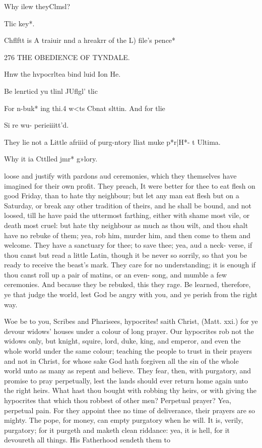 \documentclass{custom}
\begin{document}
{Why ilew 
theyClmsl? 

Tlic key*. 

Chflftt is A 
traiuir nnd 
a hreakrr 
of the 
L) file's 
pence* 


276
THE OBEDIENCE OF
TYNDALE.

Hnw the 
hvpocrltea 
bind luid 
Ion He. 

Be lenrticd 
yu tlinl 
JUflgl' tlic 

For n-buk* 
ing thi.4 
w<ts Cbnat 
slttin. And 
for tlie 

Si re wu- 
perieiiitt'd. 

They lie 
not a Little 
afriiid of 
purg-ntory 
lliat muke 
p*r|H*- 
t Ultima. 

Why it ia 
Cttlled jmr* 
g»lory. 

loose and justify with pardons aud ceremonies, which 
they themselves have imagined for their own profit. They 
preach, It were better for thee to eat flesh on good Friday, 
than to hate thy neighbour; but let any man eat flesh but 
on a Saturday, or break any other tradition of theirs, and 
he shall be bound, and not loosed, till he have paid the 
uttermost farthing, either with shame most vile, or death 
most cruel: but hate thy neighbour as much as thou wilt, 
and thou shalt have no rebuke of them; yea, rob him, 
murder him, and then come to them and welcome. They 
have a sanctuary for thee; to save thee; yea, aud a neck- 
verse, if thou canst but read a little Latin, though 
it be never so sorrily, so that you be ready to receive the 
beast's mark. They care for no understanding; it is 
enough if thou canst roll up a pair of matins, or an even- 
song, and mumble a few ceremonies. And because they 
be rebuked, this they rage. Be learned, therefore, ye 
that judge the world, lest God be angry with you, and ye 
perish from the right way. 

Woe be to you, Scribes and Pharisees, hypocrites! saith 
Christ, (Matt. xxi.) for ye devour widows' houses under a 
colour of long prayer. Our hypocrites rob not the widows 
only, but knight, squire, lord, duke, king, and emperor, and 
even the whole world under the same colour; teaching 
the people to trust in their prayers and not in Christ, for 
whose sake God hath forgiven all the sin of the whole 
world unto as many as repent and believe. They fear, 
then, with purgatory, and promise to pray perpetually, lest 
the lands should ever return home again unto the right 
heirs. What hast thou bought with robbing thy heirs, 
or with giving the hypocrites that which thou robbest of 
other men? Perpetual prayer? Yea, perpetual pain. 
For they appoint thee no time of deliverance, their 
prayers are so mighty. The pope, for money, can empty 
purgatory when he will. It is, verily, purgatory; for it 
purgeth and maketh clean riddance: yea, it is hell, for it 
devoureth all things. His Fatherhood sendeth them to 


}
\end{document}
